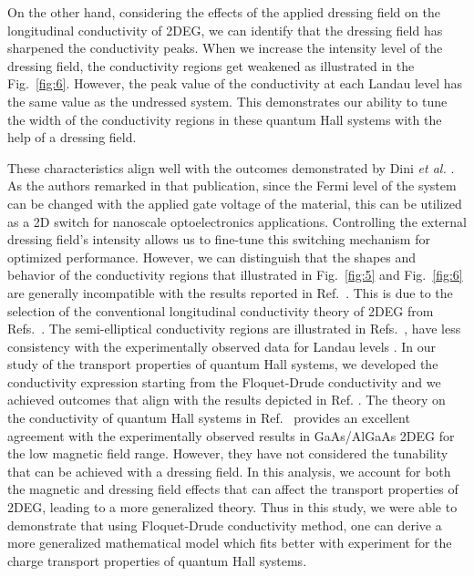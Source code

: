 \documentclass[
 reprint,
 amsmath,amssymb,
 aps,
 prb,
]{revtex4-2}
\begin{document}
On the other hand, considering the effects of the applied dressing field on the longitudinal conductivity of 2DEG, we can identify that the dressing field has sharpened the conductivity peaks.
When we increase the intensity level of the dressing field, the conductivity regions get weakened as illustrated in the Fig.~\ref{fig:6}.
However, the peak value of the conductivity at each Landau level has the same value as the undressed system. This demonstrates our ability to tune the width of the conductivity regions in these quantum Hall systems with the help of a dressing field.

These characteristics align well with the outcomes demonstrated by Dini \textit{et al.} \cite{dini16}.  As the authors remarked in that publication, since the Fermi level of the system can be changed with the applied gate voltage of the material, this can be utilized as a 2D switch for nanoscale optoelectronics applications. Controlling  the external dressing field's intensity allows us to fine-tune this switching mechanism for optimized performance.
However, we can distinguish that the shapes and behavior of the conductivity regions that illustrated in Fig.~\ref{fig:5} and Fig.~\ref{fig:6} are generally incompatible with the results reported in Ref.~\cite{dini16}. This is due to the selection of the conventional longitudinal conductivity theory of 2DEG from Refs.~\cite{ando74_1,ando82}. The semi-elliptical conductivity regions are  illustrated in Refs.~\cite{dini16,ando74_1,ando82}, have less consistency with the experimentally observed data for Landau levels \cite{endo09}.
In our study of the transport properties of quantum Hall systems, we developed the conductivity expression starting from the Floquet-Drude conductivity \cite{wackerl20} and we achieved outcomes that align with the results depicted in Ref. \cite{endo09}.
The theory on the conductivity of quantum Hall systems in Ref.~\cite{endo09} provides an excellent agreement with the experimentally observed results in GaAs/AlGaAs 2DEG for the low magnetic field range.
However, they have not considered the tunability that can be achieved with a dressing field. In this analysis, we account for both the magnetic and dressing field effects that can affect the transport properties of 2DEG, leading to a more generalized theory. Thus in this study, we were able to demonstrate that using Floquet-Drude conductivity method, one can derive a more generalized mathematical model which fits better with experiment for the charge transport properties of quantum Hall systems.
\end{document}
